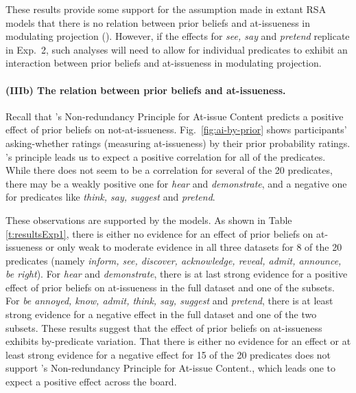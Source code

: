 \documentclass[11pt,fleqn]{article}
\newcommand{\6}{\mbox{$[\hspace*{-.6mm}[$}}
\newcommand{\9}{\mbox{$]\hspace*{-.6mm}]$}}
\newcommand{\citepos}[1]{\citeauthor{#1}'s \citeyear{#1}}
\begin{document}
These results provide some support for the assumption made in extant RSA models that there is no relation between prior beliefs and at-issueness in modulating projection (\citealt{qing-etal2016,stevens-etal2017,warstadt2022,pan-degen2023}). However, if the effects for {\em see, say} and {\em pretend} replicate in Exp.~2, such analyses will need to allow for individual predicates to exhibit an interaction between prior beliefs and at-issueness in modulating projection.

\paragraph{(IIIb) The relation between prior beliefs and at-issueness.} 

Recall that \citepos{tonhauser-etal-eval} Non-redundancy Principle for At-issue Content predicts a positive effect of prior beliefs on not-at-issueness. Fig.~\ref{fig:ai-by-prior} shows participants' asking-whether ratings (measuring at-issueness) by their prior probability ratings. \citepos{tonhauser-etal-eval} principle leads us to expect a positive correlation for all of the predicates. While there does not seem to be a correlation for several of the 20 predicates, there may be a weakly positive one for {\em hear} and {\em demonstrate}, and a negative one for predicates like {\em think, say, suggest} and {\em pretend}.

These observations are supported by the models. As shown in Table \ref{t:resultsExp1}, there is either no evidence for an effect of prior beliefs on at-issueness or only weak to moderate evidence in all three datasets for 8 of the 20 predicates (namely {\em inform, see, discover, acknowledge, reveal, admit, announce, be right}). For {\em hear} and {\em demonstrate}, there is at last strong evidence for a positive effect of prior beliefs on at-issueness in the full dataset and one of the subsets. For {\em be annoyed, know, admit, think, say, suggest} and {\em pretend}, there is at least strong evidence for a negative effect in the full dataset and one of the two subsets. These results suggest that the effect of prior beliefs on at-issueness exhibits by-predicate variation. That there is either no evidence for an effect or at least strong evidence for a negative effect for 15 of the 20 predicates does not support \citepos{tonhauser-etal-eval} Non-redundancy Principle for At-issue Content., which leads one to expect a positive effect across the board.


\setlength{\fboxrule}{0pt}
\end{document}
